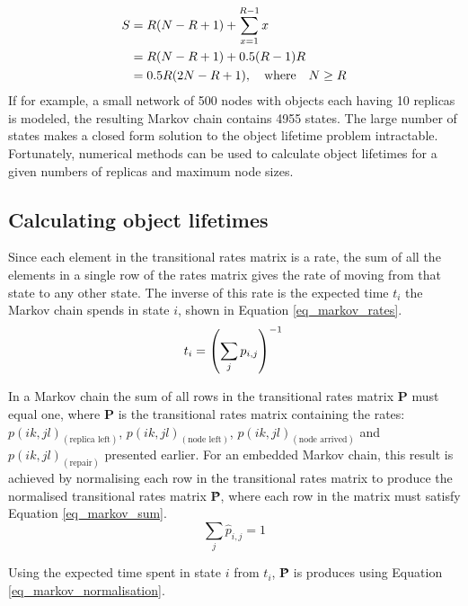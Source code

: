 \documentclass[10pt,a4paper,conference]{IEEEtran}
\begin{document}
\begin{align}
       S & = R(N - R + 1) + \sum_{x=1}^{R-1} x\label{eq_states_num_init}\\
         & = R(N - R + 1) + 0.5 (R - 1) R\notag\\
         & = 0.5 R (2 N - R + 1), \quad\textrm{where}\quad N \geq R \label{eq_states_num_ans}
\end{align}
%
If for example, a small network of 500 nodes with objects each having 10 replicas is modeled, the resulting Markov chain contains 4955 states. The large number of states makes a closed form solution to the object lifetime problem intractable. Fortunately, numerical methods can be used to calculate object lifetimes for a given numbers of replicas and maximum node sizes.

\subsection{Calculating object lifetimes}

Since each element in the transitional rates matrix is a rate, the sum of all the elements in a single row of the rates matrix gives the rate of moving from that state to any other state. The inverse of this rate is the expected time $t_i$ the Markov chain spends in state $i$, shown in Equation \eqref{eq_markov_rates}.
%
\begin{equation} \label{eq_markov_rates}
    t_i = \left(\sum_{j} p_{i, j}\right)^{-1}\\
\end{equation}

In a Markov chain the sum of all rows in the transitional rates matrix \textbf{P} must equal one, where \textbf{P} is the transitional rates matrix containing the rates: $p(i k,j l)_{(\textrm{replica left})}$, $p(i k,j l)_{(\textrm{node left})}$, $p(i k,j l)_{(\textrm{node arrived})}$ and $p(i k,j l)_{(\textrm{repair})}$ presented earlier. For an embedded Markov chain, this result is achieved by normalising each row in the transitional rates matrix to produce the normalised transitional rates matrix \textbf{\^{P}}, where each row in the matrix must satisfy Equation \eqref{eq_markov_sum}.
%
\begin{equation} \label{eq_markov_sum}
    \sum_{j} \hat{p}_{i, j} = 1
\end{equation}

Using the expected time spent in state $i$ from $t_i$, \textbf{\^{P}} is produces using Equation \eqref{eq_markov_normalisation}.
\end{document}
